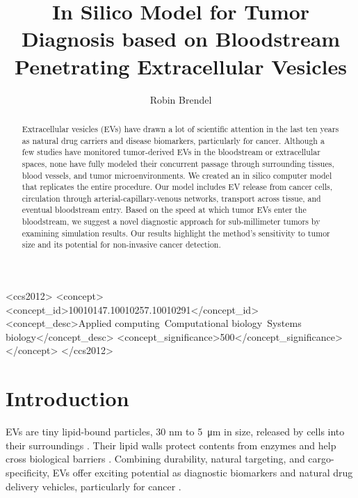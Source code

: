 \documentclass[sigconf]{acmart}
\begin{document}
\title{In Silico Model for Tumor Diagnosis based on Bloodstream Penetrating Extracellular Vesicles}
\author{Robin Brendel}

\begin{abstract}
Extracellular vesicles (EVs) have drawn a lot of scientific attention in the last ten years as natural drug carriers and disease biomarkers, particularly for cancer. Although a few studies have monitored tumor-derived EVs in the bloodstream or extracellular spaces, none have fully modeled their concurrent passage through surrounding tissues, blood vessels, and tumor microenvironments. We created an in silico computer model that replicates the entire procedure. Our model includes EV release from cancer cells, circulation through arterial-capillary-venous networks, transport across tissue, and eventual bloodstream entry. Based on the speed at which tumor EVs enter the bloodstream, we suggest a novel diagnostic approach for sub-millimeter tumors by examining simulation results. Our results highlight the method's sensitivity to tumor size and its potential for non-invasive cancer detection. 
\end{abstract}

\begin{CCSXML}
<ccs2012>
 <concept>
  <concept_id>10010147.10010257.10010291</concept_id>
  <concept_desc>Applied computing~Computational biology~Systems biology</concept_desc>
  <concept_significance>500</concept_significance>
 </concept>
</ccs2012>
\end{CCSXML}



\maketitle

\section{Introduction}
\label{sec: introduction}
EVs are tiny lipid-bound particles, 30 nm to \SI{5}{\micro\meter} in size, released by cells into their surroundings \cite{Doyle_2019}. Their lipid walls protect contents from enzymes and help cross biological barriers \cite{Arjmandi_2021}. Combining durability, natural targeting, and cargo-specificity, EVs offer exciting potential as diagnostic biomarkers and natural drug delivery vehicles, particularly for cancer \cite{Doyle_2019}.
\end{document}
